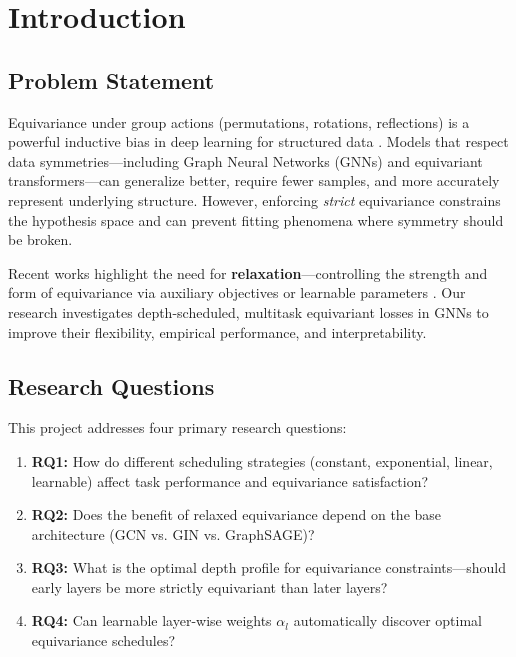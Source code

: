 \documentclass[11pt,a4paper]{article}
\begin{document}
\section{Introduction}

\subsection{Problem Statement}

Equivariance under group actions (permutations, rotations, reflections) is a powerful inductive bias in deep learning for structured data \cite{bronstein2021geometric}. Models that respect data symmetries---including Graph Neural Networks (GNNs) and equivariant transformers---can generalize better, require fewer samples, and more accurately represent underlying structure. However, enforcing \textit{strict} equivariance constrains the hypothesis space and can prevent fitting phenomena where symmetry should be broken.

Recent works highlight the need for \textbf{relaxation}---controlling the strength and form of equivariance via auxiliary objectives or learnable parameters \cite{elhag2024remul, vanderouderaa2023layerwise, hofgard2024relaxed}. Our research investigates depth-scheduled, multitask equivariant losses in GNNs to improve their flexibility, empirical performance, and interpretability.

\subsection{Research Questions}

This project addresses four primary research questions:

\begin{enumerate}
    \item \textbf{RQ1:} How do different scheduling strategies (constant, exponential, linear, learnable) affect task performance and equivariance satisfaction?
    
    \item \textbf{RQ2:} Does the benefit of relaxed equivariance depend on the base architecture (GCN vs. GIN vs. GraphSAGE)?
    
    \item \textbf{RQ3:} What is the optimal depth profile for equivariance constraints---should early layers be more strictly equivariant than later layers?
    
    \item \textbf{RQ4:} Can learnable layer-wise weights $\alpha_l$ automatically discover optimal equivariance schedules?
\end{enumerate}
\end{document}
